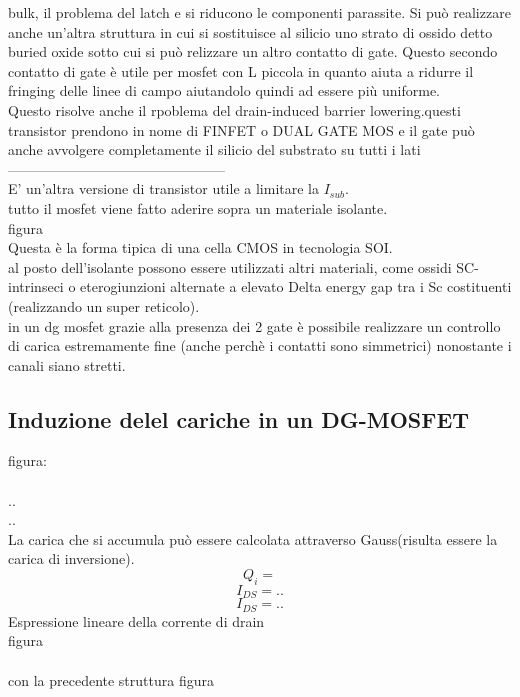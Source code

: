 bulk, il problema del latch e si riducono le componenti parassite. Si può realizzare anche un'altra struttura in cui si sostituisce al silicio uno strato di ossido detto buried oxide sotto cui si può relizzare un altro contatto di gate.
Questo secondo contatto di gate è utile per mosfet con L piccola in quanto aiuta a ridurre il fringing delle linee di campo aiutandolo quindi ad essere più uniforme.\\
Questo risolve anche il rpoblema del drain-induced barrier lowering.questi transistor prendono in nome di FINFET o DUAL GATE MOS e il gate può anche avvolgere completamente il silicio del substrato su tutti i lati\\
%
-----------------------------------------------\\
E' un'altra versione di transistor utile a limitare la $I_{sub}$.\\
tutto il mosfet viene fatto aderire sopra un materiale isolante.\\
figura\\
Questa è la forma tipica di una cella CMOS in tecnologia SOI.\\
al posto dell'isolante possono essere utilizzati altri materiali, come ossidi SC-intrinseci o eterogiunzioni alternate a elevato Delta energy gap tra i Sc costituenti (realizzando un super reticolo).\\
in un dg mosfet grazie alla presenza dei 2 gate è possibile realizzare un controllo di carica estremamente fine (anche perchè i contatti sono simmetrici) nonostante i canali siano stretti.
\subsection{Induzione delel cariche in un DG-MOSFET}
figura:\\
\\
..\\
..\\
La carica che si accumula può essere calcolata attraverso Gauss(risulta essere la carica di inversione).
\begin{equation}
    Q_i=
\end{equation}
\begin{equation}
    I_{DS}=..
\end{equation}
\begin{equation}
    I_{DS}=..
\end{equation}
Espressione lineare della corrente di drain\\
figura\\
\\
con la precedente struttura
figura\\

